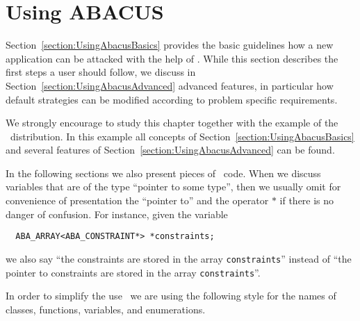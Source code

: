 
\chapter{Using ABACUS}
\label{chapter:UsingAbacus}

Section~\ref{section:UsingAbacusBasics} provides the basic guidelines 
how a new application can be attacked with the help of \ABACUS. While
this section describes the first steps a user should follow, we discuss
in Section~\ref{section:UsingAbacusAdvanced}
advanced features, in particular how default strategies
can be modified according to problem specific requirements.

We strongly encourage to study this chapter together with the example
of the \ABACUS\ distribution. In this example all concepts of
Section~\ref{section:UsingAbacusBasics} and several features of 
Section~\ref{section:UsingAbacusAdvanced} can be found.

In the following sections we also present pieces of \CPLUSPLUS\ code.
When we discuss variables that are of the type ``pointer to some type'',
then we usually omit for convenience of presentation the ``pointer to''
and the operator $*$ if there is no danger of confusion.
For instance, given the variable
\begin{verbatim}
  ABA_ARRAY<ABA_CONSTRAINT*> *constraints;
\end{verbatim}
we also say ``the constraints are stored in the array {\tt constraints}''
instead of ``the pointer to constraints are stored in the array
{\tt *constraints}''.


In order to simplify the use \ABACUS\ we are using the following style
for the names of classes, functions, variables, and enumerations.

